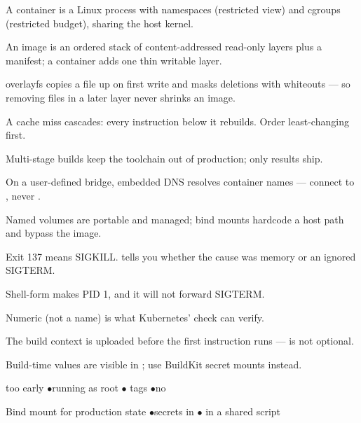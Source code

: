 
\begin{tickcheck}
  \item A container is a Linux process with namespaces (restricted view) and cgroups (restricted budget), sharing the host kernel.
  \item An image is an ordered stack of content-addressed read-only layers plus a manifest; a container adds one thin writable layer.
  \item overlayfs copies a file up on first write and masks deletions with whiteouts --- so removing files in a later layer never shrinks an image.
  \item A cache miss cascades: every instruction below it rebuilds. Order least-changing first.
  \item Multi-stage builds keep the toolchain out of production; only  results ship.
  \item On a user-defined bridge, embedded DNS resolves container names --- connect to , never .
  \item Named volumes are portable and managed; bind mounts hardcode a host path and bypass the image.
  \item Exit 137 means SIGKILL.  tells you whether the cause was memory or an ignored SIGTERM.
\end{tickcheck}

\begin{wbitem}
  \item Shell-form  makes  PID 1, and it will not forward SIGTERM.
  \item Numeric  (not a name) is what Kubernetes'  check can verify.
  \item The build context is uploaded before the first instruction runs ---  is not optional.
  \item Build-time  values are visible in ; use BuildKit secret mounts instead.
\end{wbitem}

\begin{wbitem}
  \item {} too early \quad$\bullet$\quad running as root \quad$\bullet$\quad {} tags \quad$\bullet$\quad no 
  \item Bind mount for production state \quad$\bullet$\quad secrets in  \quad$\bullet$\quad {} in a shared script
\end{wbitem}

